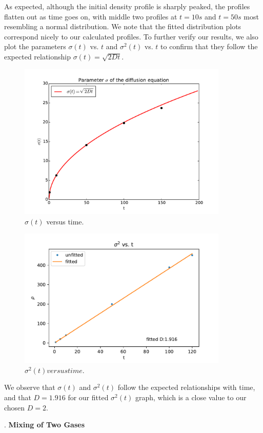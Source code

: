 \documentclass{article}
\begin{document}
\noindent As expected, although the initial density profile is sharply peaked, the profiles flatten out as time goes on, with middle two profiles at $t = 10 s$ and $t = 50 s$ most resembling a normal distribution. We note that the fitted distribution plots correspond nicely to our calculated profiles. To further verify our results, we also plot the parameters $\sigma(t)$ vs. $t$ and $\sigma^{2}(t)$ vs. $t$ to confirm that they follow the expected relationship $\sigma(t) = \sqrt{2Dt}$.\par
\begin{figure}[H]
\centering
\includegraphics[width=10cm]{sigma.pdf}
\caption{$\sigma(t)$ versus time.}
\end{figure}
\begin{figure}[H]
\centering
\includegraphics[width=10cm]{sigma2fit.pdf}
\caption{$\sigma^{2}(t) versus time.$}
\end{figure}
\noindent We observe that $\sigma(t)$ and $\sigma^{2}(t)$ follow the expected relationships with time, and that $D = 1.916$ for our fitted $\sigma^{2}(t)$ graph, which is a close value to our chosen $D = 2$.\par
\bigskip
{}. \textbf{Mixing of Two Gases}\par
\end{document}
